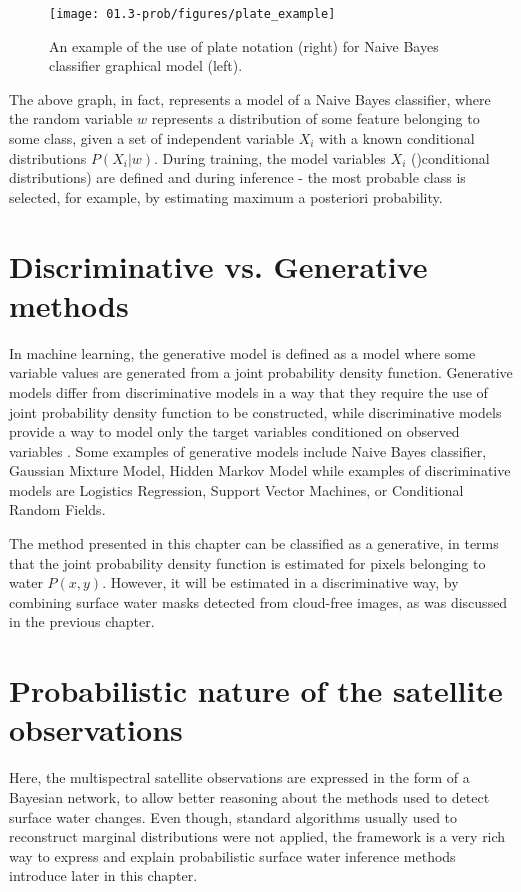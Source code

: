 \begin{figure}[H]
	\centering
	\texttt{[image: 01.3-prob/figures/plate\_example]}
	\caption{An example of the use of plate notation (right) for Naive Bayes classifier graphical model (left).}
	\label{fig:plate-example}
\end{figure}

The above graph, in fact, represents a model of a Naive Bayes classifier, where the random variable $w$ represents a distribution of some feature belonging to some class, given a set of independent variable $X_i$ with a known conditional distributions $P{(X_i|w)}$. During training, the model variables $X_i$ ()conditional distributions) are defined and during inference - the most probable class is selected, for example, by estimating maximum a posteriori probability.

\section{Discriminative vs. Generative methods}

In machine learning, the generative model is defined as a model where some variable values are generated from a joint probability density function. Generative models differ from discriminative models in a way that they require the use of joint probability density function to be constructed, while discriminative models provide a way to model only the target variables conditioned on observed variables \citet{ng2002discriminative}. Some examples of generative models include Naive Bayes classifier, Gaussian Mixture Model, Hidden Markov Model while examples of discriminative models are Logistics Regression, Support Vector Machines, or Conditional Random Fields. 

The method presented in this chapter can be classified as a generative, in terms that the joint probability density function is estimated for pixels belonging to water $P(x, y)$. However, it will be estimated in a discriminative way, by combining surface water masks detected from cloud-free images, as was discussed in the previous chapter.

\section{Probabilistic nature of the satellite observations}

Here, the multispectral satellite observations are expressed in the form of a Bayesian network, to allow better reasoning about the methods used to detect surface water changes. Even though, standard algorithms usually used to reconstruct marginal distributions were not applied, the framework is a very rich way to express and explain probabilistic surface water inference methods introduce later in this chapter.

